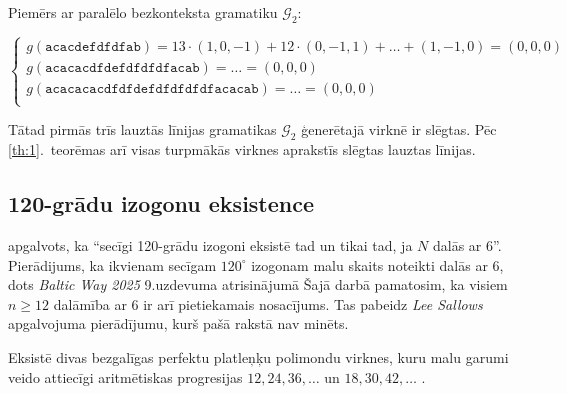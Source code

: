 \documentclass[utf8]{ludis2022}
\begin{document}
Piemērs ar paralēlo bezkonteksta gramatiku 
$\mathcal{G}_2$: 

\vspace{-10pt}

$$\left\{ 
\begin{array}{l}
g(\mathtt{acacdefdfdfab}) = 13\cdot(1,0,-1) + 12 \cdot (0,-1,1) + \ldots + (1,-1,0) = (0,0,0)\\
g(\mathtt{acacacdfdefdfdfdfacab}) = \ldots = (0,0,0)\\
g(\mathtt{acacacacdfdfdefdfdfdfdfacacab}) = \ldots = (0,0,0)\\
\end{array}
\right.$$

Tātad pirmās trīs lauztās līnijas 
gramatikas $\mathcal{G}_2$ ģenerētajā
virknē ir slēgtas. Pēc 
\ref{th:1}.~teorēmas arī visas 
turpmākās virknes
aprakstīs slēgtas
lauztas līnijas.

\subsection{120-grādu izogonu eksistence}

\firstparskip [7] apgalvots, ka ``secīgi 
120-grādu izogoni eksistē tad un tikai tad, ja 
$N$ dalās ar $6$''. 
Pierādijums, ka ikvienam secīgam 
$120^{\circ}$ izogonam malu skaits 
noteikti dalās ar $6$, dots 
{\em Baltic Way 2025} 9.uzdevuma 
atrisinājumā 
Šajā darbā pamatosim, ka visiem $n \geq 12$
dalāmība ar $6$ ir arī pietiekamais 
nosacījums. 
Tas pabeidz {\em Lee Sallows} apgalvojuma
pierādījumu, kurš pašā rakstā nav minēts.

\begin{apgalvojums}
Eksistē divas bezgalīgas 
perfektu platleņķu polimondu virknes, 
kuru malu garumi veido attiecīgi 
aritmētiskas progresijas $12, 24, 36,\ldots$
un $18, 30, 42, \ldots$ .
\end{apgalvojums}
\end{document}
